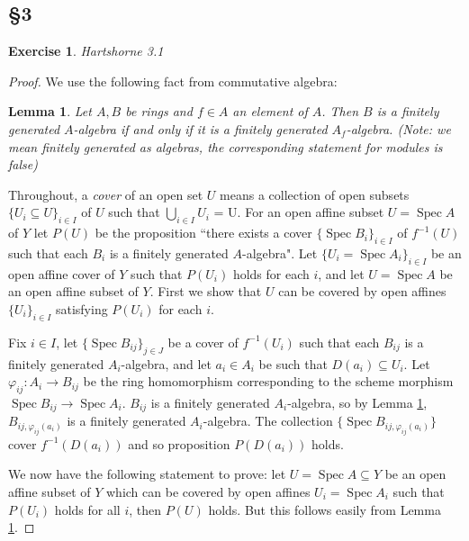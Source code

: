 \documentclass[12pt]{article}
\numberwithin{thm}{subsection}
\numberwithin{defn}{subsection}
\newtheorem{lemma}{Lemma}
\numberwithin{lemma}{subsection}
\numberwithin{example}{subsection}
\numberwithin{notation}{subsection}
\numberwithin{cor}{subsection}
\numberwithin{remark}{subsection}
\numberwithin{condition}{subsection}
\numberwithin{question}{subsection}
\numberwithin{construction}{subsection}
\newtheorem{exercise}{Exercise}
\numberwithin{construction}{subsection}
\numberwithin{construction}{subsection}
\begin{document}
\subsection{\S 3}
\begin{exercise}
Hartshorne 3.1
\end{exercise}
\begin{proof}
We use the following fact from commutative algebra:
\begin{lemma}\label{lem:algebra_fin_gen}
Let $A,B$ be rings and $f \in A$ an element of $A$. Then $B$ is a finitely generated $A$-algebra if and only if it is a finitely generated $A_f$-algebra. (Note: we mean finitely generated as \emph{algebras}, the corresponding statement for modules is false)
\end{lemma}
Throughout, a \emph{cover} of an open set $U$ means a collection of open subsets $\lbrace U_i \subseteq U\rbrace_{i \in I}$ of $U$ such that $\bigcup_{i \in I}U_i$ = U. For an open affine subset $U = \operatorname{Spec}A$ of $Y$ let $P(U)$ be the proposition ``there exists a cover $\lbrace \operatorname{Spec}B_i\rbrace_{i\in I}$ of $f^{-1}(U)$ such that each $B_i$ is a finitely generated $A$-algebra". Let $\lbrace U_i = \operatorname{Spec}A_i\rbrace_{i \in I}$ be an open affine cover of $Y$ such that $P(U_i)$ holds for each $i$, and let $U = \operatorname{Spec}A$ be an open affine subset of $Y$. First we show that $U$ can be covered by open affines $\lbrace U_i\rbrace_{i \in I}$ satisfying $P(U_i)$ for each $i$.

Fix $i \in I$, let $\lbrace \operatorname{Spec}B_{ij}\rbrace_{j \in J}$ be a cover of $f^{-1}(U_i)$ such that each $B_{ij}$ is a finitely generated $A_i$-algebra, and let $a_i \in A_i$ be such that $D(a_i) \subseteq U_i$.  Let $\varphi_{ij}: A_i \to B_{ij}$ be the ring homomorphism corresponding to the scheme morphism $\operatorname{Spec}B_{ij} \to \operatorname{Spec}A_i$. $B_{ij}$ is a finitely generated $A_{i}$-algebra, so by Lemma \ref{lem:algebra_fin_gen}, $B_{ij,\varphi_{ij}(a_i)}$ is a finitely generated $A_{i}$-algebra. The collection $\lbrace \operatorname{Spec}B_{ij,\varphi_{ij}(a_i)}\rbrace$ cover $f^{-1}(D(a_i))$ and so proposition $P(D(a_i))$ holds.

We now have the following statement to prove: let $U = \operatorname{Spec}A \subseteq Y$ be an open affine subset of $Y$ which can be covered by open affines $U_i = \operatorname{Spec}A_i$ such that $P(U_i)$ holds for all $i$, then $P(U)$ holds. But this follows easily from Lemma \ref{lem:algebra_fin_gen}.
\end{proof}
\end{document}
